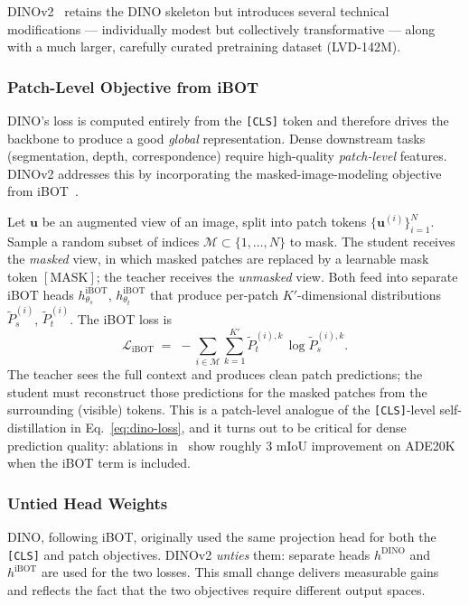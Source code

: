 \documentclass[11pt,a4paper]{article}
\newcommand{\vect}[1]{\mathbf{#1}}
\newcommand{\loss}{\mathcal{L}}
\newcommand{\thetaS}{\theta_{s}}
\newcommand{\thetaT}{\theta_{t}}
\begin{document}
DINOv2~\citep{oquab2024dinov2} retains the DINO skeleton but introduces
several technical modifications --- individually modest but collectively
transformative --- along with a much larger, carefully curated pretraining
dataset (LVD-142M).

\subsubsection{Patch-Level Objective from iBOT}

DINO's loss is computed entirely from the \texttt{[CLS]} token and therefore
drives the backbone to produce a good \emph{global} representation. Dense
downstream tasks (segmentation, depth, correspondence) require high-quality
\emph{patch-level} features. DINOv2 addresses this by incorporating the
masked-image-modeling objective from iBOT~\citep{zhou2021ibot}.

Let $\vect{u}$ be an augmented view of an image, split into patch tokens
$\{\vect{u}^{(i)}\}_{i=1}^{N}$. Sample a random subset of indices
$\mathcal{M} \subset \{1,\ldots,N\}$ to mask. The student receives the
\emph{masked} view, in which masked patches are replaced by a learnable
mask token $[\text{MASK}]$; the teacher receives the \emph{unmasked} view.
Both feed into separate iBOT heads $h^{\text{iBOT}}_{\thetaS}$,
$h^{\text{iBOT}}_{\thetaT}$ that produce per-patch $K'$-dimensional
distributions $\tilde{P}_{s}^{(i)}$, $\tilde{P}_{t}^{(i)}$. The iBOT loss
is
\begin{equation}
\loss_{\text{iBOT}} \;=\; - \sum_{i \in \mathcal{M}}
\sum_{k=1}^{K'} \tilde{P}_{t}^{(i),k} \, \log \tilde{P}_{s}^{(i),k}.
\label{eq:ibot}
\end{equation}
The teacher sees the full context and produces clean patch predictions;
the student must reconstruct those predictions for the masked patches
from the surrounding (visible) tokens. This is a patch-level analogue of
the \texttt{[CLS]}-level self-distillation in Eq.~\eqref{eq:dino-loss},
and it turns out to be critical for dense prediction quality: ablations
in~\citet{oquab2024dinov2} show roughly $3$ mIoU improvement on ADE20K
when the iBOT term is included.

\subsubsection{Untied Head Weights}

DINO, following iBOT, originally used the same projection head for both
the \texttt{[CLS]} and patch objectives. DINOv2 \emph{unties} them: separate
heads $h^{\text{DINO}}$ and $h^{\text{iBOT}}$ are used for the two losses.
This small change delivers measurable gains and reflects the fact that the
two objectives require different output spaces.
\end{document}
